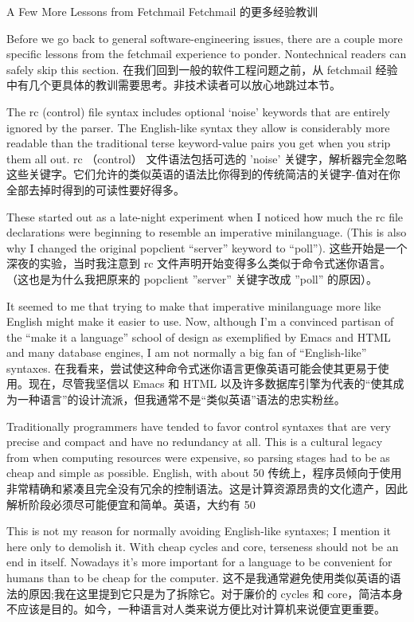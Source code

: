 \documentclass[a4paper,12pt,UTF8,twoside]{ctexbook}
\begin{document}
A Few More Lessons from Fetchmail
Fetchmail 的更多经验教训

Before we go back to general software-engineering issues, there are a couple more specific lessons from the fetchmail experience to ponder. Nontechnical readers can safely skip this section.
在我们回到一般的软件工程问题之前，从 fetchmail 经验中有几个更具体的教训需要思考。非技术读者可以放心地跳过本节。

The rc (control) file syntax includes optional `noise' keywords that are entirely ignored by the parser. The English-like syntax they allow is considerably more readable than the traditional terse keyword-value pairs you get when you strip them all out.
rc （control） 文件语法包括可选的 'noise' 关键字，解析器完全忽略这些关键字。它们允许的类似英语的语法比你得到的传统简洁的关键字-值对在你全部去掉时得到的可读性要好得多。

These started out as a late-night experiment when I noticed how much the rc file declarations were beginning to resemble an imperative minilanguage. (This is also why I changed the original popclient ``server'' keyword to ``poll'').
这些开始是一个深夜的实验，当时我注意到 rc 文件声明开始变得多么类似于命令式迷你语言。（这也是为什么我把原来的 popclient ''server'' 关键字改成 ''poll'' 的原因）。

It seemed to me that trying to make that imperative minilanguage more like English might make it easier to use. Now, although I'm a convinced partisan of the ``make it a language'' school of design as exemplified by Emacs and HTML and many database engines, I am not normally a big fan of ``English-like'' syntaxes.
在我看来，尝试使这种命令式迷你语言更像英语可能会使其更易于使用。现在，尽管我坚信以 Emacs 和 HTML 以及许多数据库引擎为代表的“使其成为一种语言”的设计流派，但我通常不是“类似英语”语法的忠实粉丝。

Traditionally programmers have tended to favor control syntaxes that are very precise and compact and have no redundancy at all. This is a cultural legacy from when computing resources were expensive, so parsing stages had to be as cheap and simple as possible. English, with about 50%
传统上，程序员倾向于使用非常精确和紧凑且完全没有冗余的控制语法。这是计算资源昂贵的文化遗产，因此解析阶段必须尽可能便宜和简单。英语，大约有 50%

This is not my reason for normally avoiding English-like syntaxes; I mention it here only to demolish it. With cheap cycles and core, terseness should not be an end in itself. Nowadays it's more important for a language to be convenient for humans than to be cheap for the computer.
这不是我通常避免使用类似英语的语法的原因;我在这里提到它只是为了拆除它。对于廉价的 cycles 和 core，简洁本身不应该是目的。如今，一种语言对人类来说方便比对计算机来说便宜更重要。
\end{document}
